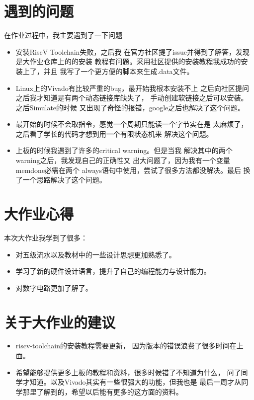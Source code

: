 \section{遇到的问题}
在作业过程中，我主要遇到了一下问题
\begin{itemize}
		\item 安装RiscV Toolchain失败，之后我
				在官方社区提了issue并得到了解答，发现是大作业仓库上的的安装
				教程有问题。采用社区提供的安装教程我成功的安装上了，并且
				我写了一个更方便的脚本来生成.data文件。
		\item Linux上的Vivado有比较严重的bug，最开始我根本安装不上
				之后向社区提问之后我才知道是有两个动态链接库缺失了，
				手动创建软链接之后可以安装。之后Simulate的时候
				又出现了奇怪的报错，google之后也解决了这个问题。
		\item 最开始的时候不会取指令，感觉一个周期只能读一个字节实在是
				太麻烦了，之后看了学长的代码才想到用一个有限状态机来
				解决这个问题。
		\item 上板的时候我遇到了许多的critical warning。但是当我
				解决其中的两个warning之后，我发现自己的正确性又
				出大问题了，因为我有一个变量memdone必需在两个
				always语句中使用，尝试了很多方法都没解决。最后
				换了一个思路解决了这个问题。
\end{itemize}
\section{大作业心得}
本次大作业我学到了很多：
\begin{itemize}
		\item 对五级流水以及教材中的一些设计思想更加熟悉了。
		\item 学习了新的硬件设计语言，提升了自己的编程能力与设计能力。
		\item 对数字电路更加了解了。
\end{itemize}
\section{关于大作业的建议}
\begin{itemize}
		\item riscv-toolchain的安装教程需要更新，
				因为版本的错误浪费了很多时间在上面。
		\item 希望能够提供更多上板的教程和资料，很多时候错了不知道为什么，
				问了同学才知道。以及Vivado其实有一些很强大的功能，但我也是
				最后一周才从同学那里了解到的，希望以后能有更多的这方面的资料。
\end{itemize}



